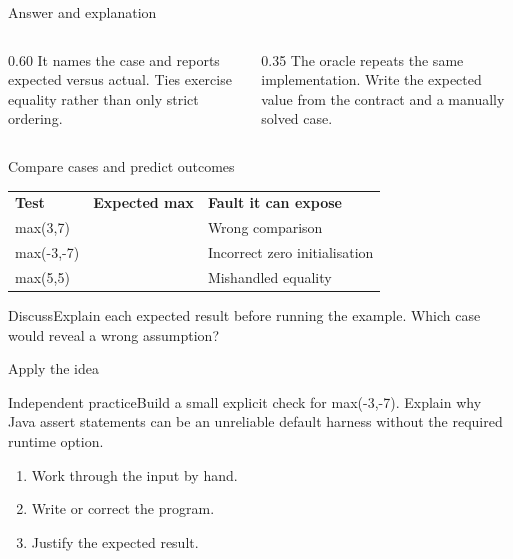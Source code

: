 \documentclass[10pt,aspectratio=169]{beamer}
\begin{document}
\begin{frame}[fragile,t]{Answer and explanation}
\begin{columns}[T,onlytextwidth]\begin{column}{0.60\textwidth}
It names the case and reports expected versus actual. Ties exercise equality rather than only strict ordering.
\end{column}\begin{column}{0.35\textwidth}\small
The oracle repeats the same implementation. Write the expected value from the contract and a manually solved case.
\end{column}\end{columns}
\end{frame}


\begin{frame}[fragile,t]{Compare cases and predict outcomes}
\small\renewcommand{\arraystretch}{1.5}
\begin{tabularx}{\textwidth}{>{\raggedright\arraybackslash}X>{\raggedright\arraybackslash}X>{\raggedright\arraybackslash}X}\rowcolor{navy}
\color{white}\bfseries Test & \color{white}\bfseries Expected max & \color{white}\bfseries Fault it can expose\\
max(3,7) & 7 & Wrong comparison\\
max(-3,-7) & -3 & Incorrect zero initialisation\\
max(5,5) & 5 & Mishandled equality\\
\end{tabularx}\par\vspace{3mm}\begin{exampleblock}{Discuss}Explain each expected result before running the example. Which case would reveal a wrong assumption?\end{exampleblock}
\end{frame}

\begin{frame}[fragile,t]{Apply the idea}
\begin{alertblock}{Independent practice}Build a small explicit check for max(-3,-7). Explain why Java assert statements can be an unreliable default harness without the required runtime option.\end{alertblock}\vspace{3mm}\begin{enumerate}\item Work through the input by hand.\item Write or correct the program.\item Justify the expected result.\end{enumerate}
\end{frame}
\end{document}
